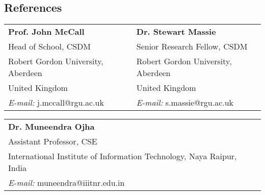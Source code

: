 \documentclass[margin,line]{res}
\begin{document}
\begin{resume}
\section{\sc References}
\vspace{.01in}
\begin{tabular}{@{}p{3in}p{3in}}
{\bf Prof. John McCall} & {\it} {\bf Dr. Stewart Massie} \\ 
Head of School, CSDM & {\it} Senior Research Fellow, CSDM \\
Robert Gordon University, Aberdeen & {\it} Robert Gordon University, Aberdeen\\
United Kingdom & United Kingdom\\
{\it E-mail:} j.mccall@rgu.ac.uk & {\it E-mail:} s.massie@rgu.ac.uk \\
\end{tabular}



\begin{tabular}{@{}p{3in}p{3in}}
{\bf Dr. Muneendra Ojha} \\ 
Assistant Professor, CSE \\
International Institute of Information Technology, Naya Raipur, India\\
{\it E-mail:} muneendra@iiitnr.edu.in \\
\end{tabular}



\end{resume}
\end{document}

